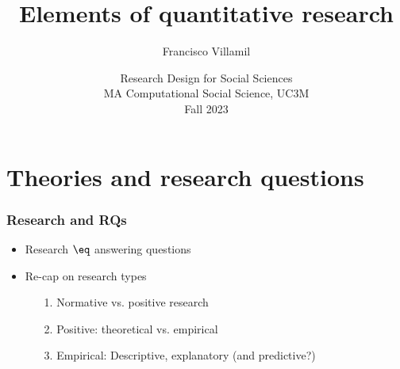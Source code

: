 \documentclass[aspectratio=43]{beamer}
\title[Lecture 2: Elements of quantitative research]{\Large Elements of quantitative research}
\author[]{Francisco Villamil}
\date[]{Research Design for Social Sciences\\MA Computational Social Science, UC3M\\Fall 2023}
\begin{document}

\begin{frame}
  \titlepage
\end{frame}

\section{Theories and research questions}

\begin{frame}
\frametitle{Research and RQs}
\centering

\begin{itemize}
  \item Research $\eq$ answering questions
  \item Re-cap on research types
  \begin{itemize}
    \item[1.] Normative vs. positive research
    \item[2.] Positive: theoretical vs. empirical
    \item[3.] Empirical: Descriptive, explanatory (and predictive?)
  \end{itemize}
\end{itemize}

\end{frame}
\end{document}
